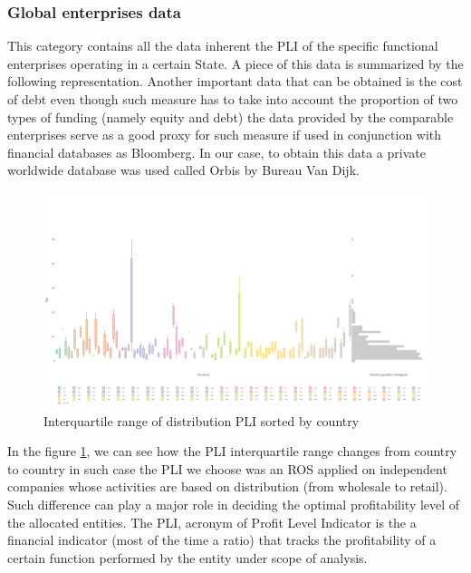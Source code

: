 \documentclass{article}
\begin{document}
\subsubsection{Global enterprises data}
This category contains all the data inherent the PLI of the specific functional enterprises operating in a certain State.
A piece of this data is summarized by the following representation. Another important data that can be obtained is the cost of debt \cite{berman_financial_2013} even though such measure has to take into account the proportion of two types of funding (namely equity and debt) the data provided by the comparable enterprises serve as a good proxy for such measure if used in conjunction with financial databases as Bloomberg. In our case, to obtain this data a private worldwide database was used called Orbis by Bureau Van Dijk.
\begin{figure}
\centering
\includegraphics[width=\textwidth]{Images/plidist.png}
\caption{Interquartile range of distribution PLI sorted by country}
\label{fig:interquartile}
\end{figure}

In the figure \ref{fig:interquartile}, we can see how the PLI interquartile range changes from country to country in such case the PLI we choose was an ROS applied on independent companies whose activities are based on distribution (from wholesale to retail). Such difference can play a major role in deciding the optimal profitability level of the allocated entities. The PLI, acronym of Profit Level Indicator is the a financial indicator (most of the time a ratio) that tracks the profitability of a certain function performed by the entity under scope of analysis.
\end{document}

